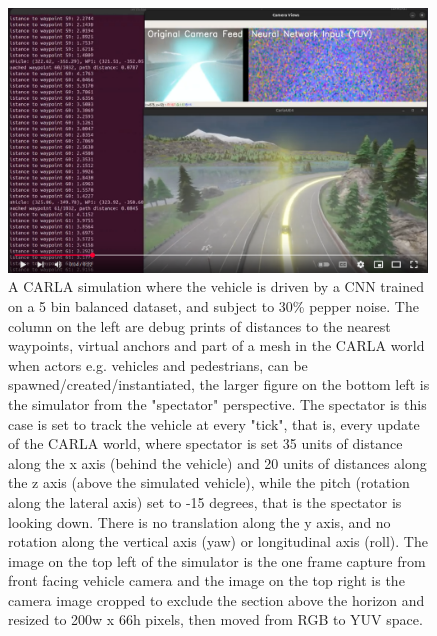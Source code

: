 \begin{figure}[h!]
\centering
\includegraphics[width=0.99\textwidth]{Figures/Results/youtubeidCzJlbYX0CnQ_experiment239_30pc_pepper_noise_5bin_cnn_balanced.png}
\caption{A CARLA simulation where the vehicle is driven by a CNN trained on a 5 bin balanced dataset, and subject to 30\% pepper noise. The column on the left are debug prints of distances to the nearest waypoints, virtual anchors and part of a mesh in the CARLA world when actors e.g. vehicles and pedestrians, can be spawned/created/instantiated, the larger figure on the bottom left is the simulator from the "spectator" perspective. The spectator is this case is set to track the vehicle at every "tick", that is, every update of the CARLA world, where spectator is set 35 units of distance along the x axis (behind the vehicle) and 20 units of distances along the z axis (above the simulated vehicle), while the pitch (rotation along the lateral axis) set to -15 degrees, that is the spectator is looking down. There is no translation along the y axis, and no rotation along the vertical axis (yaw) or longitudinal axis (roll). The image on the top left of the simulator is the one frame capture from front facing vehicle camera and the image on the top right is the camera image cropped to exclude the section above the horizon and resized to 200w x 66h pixels, then moved from RGB to YUV space.}
\label{fig:youtubeidCzJlbYX0CnQ_experiment239_30pc_pepper_noise_5bin_cnn_balanced}
\end{figure}



